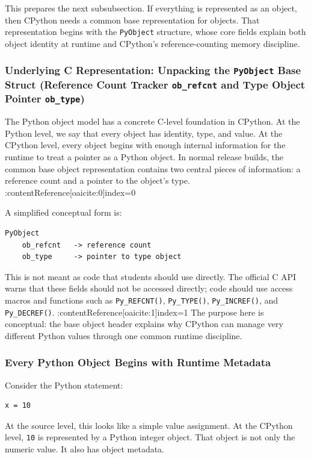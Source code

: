 This prepares the next subsubsection. If everything is represented as an object, then CPython needs a common base representation for objects. That representation begins with the \texttt{PyObject} structure, whose core fields explain both object identity at runtime and CPython's reference-counting memory discipline.


\subsubsection{Underlying C Representation: Unpacking the \texttt{PyObject} Base Struct (Reference Count Tracker \texttt{ob\_refcnt} and Type Object Pointer \texttt{ob\_type})}

The Python object model has a concrete C-level foundation in CPython. At the Python level, we say that every object has identity, type, and value. At the CPython level, every object begins with enough internal information for the runtime to treat a pointer as a Python object. In normal release builds, the common base object representation contains two central pieces of information: a reference count and a pointer to the object's type. :contentReference[oaicite:0]{index=0}

A simplified conceptual form is:

\begin{verbatim}
PyObject
    ob_refcnt   -> reference count
    ob_type     -> pointer to type object
\end{verbatim}

This is not meant as code that students should use directly. The official C API warns that these fields should not be accessed directly; code should use access macros and functions such as \texttt{Py\_REFCNT()}, \texttt{Py\_TYPE()}, \texttt{Py\_INCREF()}, and \texttt{Py\_DECREF()}. :contentReference[oaicite:1]{index=1} The purpose here is conceptual: the base object header explains why CPython can manage very different Python values through one common runtime discipline.

\subsubsection*{Every Python Object Begins with Runtime Metadata}

Consider the Python statement:

\begin{verbatim}
x = 10
\end{verbatim}

At the source level, this looks like a simple value assignment. At the CPython level, \texttt{10} is represented by a Python integer object. That object is not only the numeric value. It also has object metadata.


